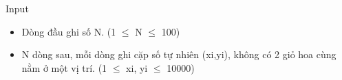 Input  
\begin{itemize}
	\item     Dòng đầu ghi số N. (1  $\le$  N  $\le$  100)   
\end{itemize}
\begin{itemize}
	\item     N dòng sau, mỗi dòng ghi cặp số tự nhiên (xi,yi), không có 2 giỏ hoa cùng nằm ở một vị trí. (1  $\le$  xi, yi  $\le$  10000)   
\end{itemize}